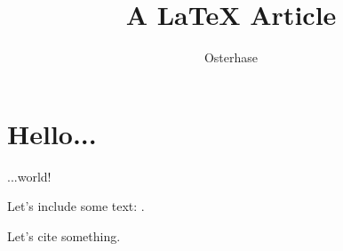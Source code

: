 \documentclass[a4paper,12pt]{article}
\title{A LaTeX Article}
\author{Osterhase}
\begin{document}
\maketitle

\section{Hello...}

...world!

Let's include some text: .

Let's cite something\cite{FRENOT:2010:INRIA-00436041:1}.



\end{document}
